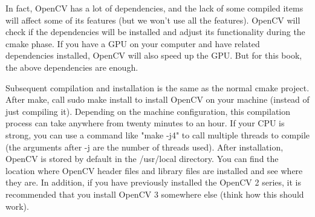 In fact, OpenCV has a lot of dependencies, and the lack of some compiled items will affect some of its features (but we won't use all the features). OpenCV will check if the dependencies will be installed and adjust its functionality during the cmake phase. If you have a GPU on your computer and have related dependencies installed, OpenCV will also speed up the GPU. But for this book, the above dependencies are enough.

Subsequent compilation and installation is the same as the normal cmake project. After make, call sudo make install to install OpenCV on your machine (instead of just compiling it). Depending on the machine configuration, this compilation process can take anywhere from twenty minutes to an hour. If your CPU is strong, you can use a command like "make -j4" to call multiple threads to compile (the arguments after -j are the number of threads used). After installation, OpenCV is stored by default in the /usr/local directory. You can find the location where OpenCV header files and library files are installed and see where they are. In addition, if you have previously installed the OpenCV 2 series, it is recommended that you install OpenCV 3 somewhere else (think how this should work).
